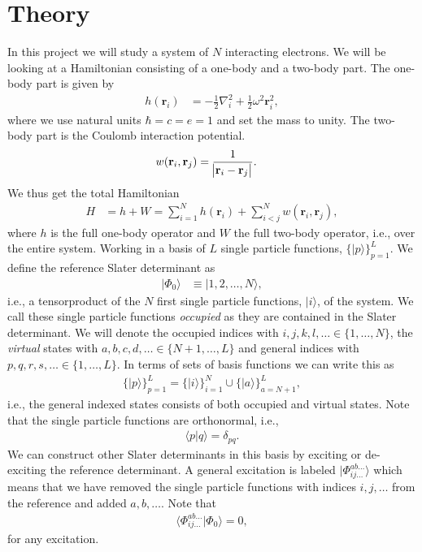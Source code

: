\documentclass[
    a4paper, aps, twocolumn, floatfix, superscriptaddress,
    nofootinbib]{revtex4-1}
\newcommand{\vf}{\mathbf}
\newcommand{\1}{\mathds{1}}
\newcommand{\half}{\frac{1}{2}}
\newcommand{\ket}[1]{\rvert #1\rangle}
\newcommand{\braket}[2]{\langle #1 \vert #2 \rangle}
\begin{document}
\section{Theory}
    In this project we will study a system of $N$ interacting electrons. We will
    be looking at a Hamiltonian consisting of a one-body and a two-body part.
    The one-body part is given by
    \begin{align}
        h(\vf{r}_i)
        &= -\half\nabla_i^2 + \half\omega^2 \vf{r}_i^2,
    \end{align}
    where we use natural units $\hbar = c = e = 1$ and set the mass to unity.
    The two-body part is the Coulomb interaction potential.
    \begin{align}
        w(\vf{r}_i, \vf{r}_j)
        &= \frac{1}{\abs{\vf{r}_i - \vf{r}_j}}.
    \end{align}
    We thus get the total Hamiltonian
    \begin{align}
        H &= h + W
        =
        \sum_{i = 1}^N h(\vf{r}_i) + \sum_{i < j}^N w(\vf{r}_i, \vf{r}_j),
    \end{align}
    where $h$ is the full one-body operator and $W$ the full two-body
    operator, i.e., over the entire system.  Working in a basis of $L$ single
    particle functions, $\{\ket{p}\}_{p = 1}^L$. We define the reference Slater
    determinant as
    \begin{align}
        \ket{\Phi_0} &\equiv \ket{1, 2, \dots, N},
    \end{align}
    i.e., a tensorproduct of the $N$ first single particle functions, $\ket{i}$,
    of the system. We call these single particle functions \emph{occupied} as
    they are contained in the Slater determinant.  We will denote the occupied
    indices with $i, j, k, l, \dots \in \{1, \dots, N\}$, the \emph{virtual}
    states with $a, b, c, d, \dots \in \{N + 1, \dots, L\}$ and general indices
    with $p, q, r, s, \dots \in \{1, \dots, L\}$. In terms of sets of basis
    functions we can write this as
    \begin{align}
        \{\ket{p}\}_{p = 1}^L
        = \{\ket{i}\}_{i = 1}^N
        \cup
        \{\ket{a}\}_{a = N + 1}^L,
    \end{align}
    i.e., the general indexed states consists of both occupied and virtual
    states. Note that the single particle functions are orthonormal, i.e.,
    \begin{align}
        \braket{p}{q} = \delta_{pq}.
    \end{align}
    We can construct other Slater determinants in this basis by exciting
    or de-exciting the reference determinant. A general excitation is labeled
    $\ket{\Phi_{ij\dots}^{ab\dots}}$ which means that we have removed the single
    particle functions with indices $i, j, \dots$ from the reference and added
    $a, b, \dots$. Note that
    \begin{align}
        \braket{\Phi^{ab\dots}_{ij\dots}}{\Phi_0} = 0,
        \label{eq:excited_overlap}
    \end{align}
    for any excitation.
\end{document}
